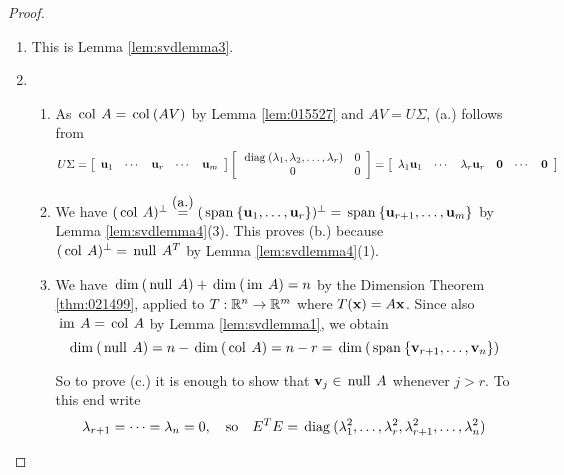 \begin{proof} 
\begin{enumerate}

\item This is Lemma \ref{lem:svdlemma3}. 

\item
\begin{enumerate}[label=\alph*.]
\item As $\thinspace\operatorname{col\medspace}A=\thinspace\operatorname{col\medspace}(AV)$ by Lemma \ref{lem:015527} and $AV=U\Sigma$, (a.) follows from
\begin{equation*}
U\Sigma =\left[ \begin{array}{ccccc} \textbf{u}_{1} & \cdots & \textbf{u}_{r} & \cdots & \textbf{u}_{m} \end{array}\right]
\left[ 
\begin{array}{cc}
\thinspace\operatorname{diag\medspace}(\lambda_{1},\lambda_{2},\ldots ,\lambda_{r}) & 0 \\ 
0 & 0
\end{array}
\right] =  \left[ \begin{array}{cccccc} \lambda_{1}\textbf{u}_{1} & \cdots & \lambda_{r}\textbf{u}_{r} & \textbf{0} & \cdots & \textbf{0} \end{array}\right]
\end{equation*}

\item We have $(\thinspace\operatorname{col\medspace}A)^{\perp}\overset{\mbox{(a.)}}{=}(\thinspace\operatorname{span\medspace}\{\textbf{u}_{1},\ldots ,\textbf{u}_{r}\})^{\perp}=\thinspace\operatorname{span\medspace}\{\textbf{u}_{r+1},\ldots ,\textbf{u}_{m}\}$ by Lemma \ref{lem:svdlemma4}(3). This proves (b.) because $(\thinspace\operatorname{col\medspace}A)^{\perp}=\thinspace\operatorname{null\medspace}A^{T}$ by Lemma \ref{lem:svdlemma4}(1). 

\item We have $\thinspace\operatorname{dim\medspace}(\thinspace\operatorname{null\medspace}A)+\thinspace\operatorname{dim\medspace}(\thinspace\operatorname{im\medspace}A)=n$
by the Dimension Theorem \ref{thm:021499}, applied to \newline $T:\mathbb{R}^{n}\rightarrow \mathbb{R}^{m}$ where $T(\textbf{x})=A\textbf{x}$. Since also $\thinspace\operatorname{im\medspace}A=\thinspace\operatorname{col\medspace}A$ by Lemma \ref{lem:svdlemma1}, we obtain
\begin{equation*}
\thinspace\operatorname{dim\medspace}(\thinspace\operatorname{null\medspace}A)=n-\thinspace\operatorname{dim\medspace}(\thinspace\operatorname{col\medspace}A)=n-r=\thinspace\operatorname{dim\medspace}(\thinspace\operatorname{span\medspace}\{\textbf{v}_{r+1},\ldots ,\textbf{v}_{n}\})
\end{equation*}

\noindent So to prove (c.) it is enough to show that $\textbf{v}_{j}\in 
\thinspace\operatorname{null\medspace}A$ whenever $j>r$. To this end write
\begin{equation*}
\lambda_{r+1}=\cdots =\lambda_{n}=0,\quad \mbox{so} \quad E^{T}E=\thinspace\operatorname{diag\medspace}(\lambda_{1}^{2},\ldots ,\lambda_{r}^{2},\lambda_{r+1}^{2},\ldots,\lambda_{n}^{2})
\end{equation*}


\end{enumerate}
\end{enumerate}
\end{proof}
